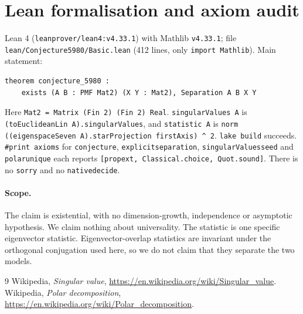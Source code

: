 \documentclass[11pt]{article}
\theoremstyle{definition}
\theoremstyle{remark}
\renewcommand{\_}{\oldus\allowbreak}
\begin{document}
\section{Lean formalisation and axiom audit}

Lean 4 (\texttt{leanprover/lean4:v4.33.1}) with Mathlib \texttt{v4.33.1}; file
\texttt{lean/Conjecture5980/Basic.lean} (412 lines, only \texttt{import Mathlib}). Main statement:
{\small\begin{verbatim}
theorem conjecture_5980 :
    exists (A B : PMF Mat2) (X Y : Mat2), Separation A B X Y
\end{verbatim}}
\noindent Here \texttt{Mat2 = Matrix (Fin 2) (Fin 2) Real}. \texttt{singularValues A} is
\texttt{(toEuclideanLin A).singularValues}, and \texttt{statistic A} is
\texttt{norm ((eigenspaceSeven A).starProjection firstAxis) \^{} 2}. \texttt{lake build} succeeds.
\texttt{\#print axioms} for \texttt{conjecture\_5980}, \texttt{explicit\_separation},
\texttt{singularValues\_seed} and \texttt{polar\_unique} each reports
\texttt{[propext, Classical.choice, Quot.sound]}. There is no \texttt{sorry} and no
\texttt{native\_decide}.

\paragraph{Scope.} The claim is existential, with no dimension-growth, independence or asymptotic
hypothesis. We claim nothing about universality. The statistic is one specific eigenvector statistic.
Eigenvector-overlap statistics are invariant under the orthogonal conjugation used here, so we do not
claim that they separate the two models.

\begin{thebibliography}{9}
 Wikipedia, \emph{Singular value}, \url{https://en.wikipedia.org/wiki/Singular_value}.
 Wikipedia, \emph{Polar decomposition}, \url{https://en.wikipedia.org/wiki/Polar_decomposition}.
\end{thebibliography}
\end{document}
